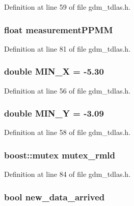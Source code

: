Definition at line 59 of file gdm\_\-tdlas.h.

\subsubsection[{measurementPPMM}]{\setlength{\rightskip}{0pt plus 5cm}float {\bf measurementPPMM}}\label{gdm__tdlas_8h_a3e354c17f76d0f236627d5285272e653}


Definition at line 81 of file gdm\_\-tdlas.h.

\subsubsection[{MIN\_\-X}]{\setlength{\rightskip}{0pt plus 5cm}double {\bf MIN\_\-X} = -\/5.30}\label{gdm__tdlas_8h_a3e390754b32f87824ad96ec0888958d3}


Definition at line 56 of file gdm\_\-tdlas.h.

\subsubsection[{MIN\_\-Y}]{\setlength{\rightskip}{0pt plus 5cm}double {\bf MIN\_\-Y} = -\/3.09}\label{gdm__tdlas_8h_a188814c015e92c2bd4daa2f823f07b75}


Definition at line 58 of file gdm\_\-tdlas.h.

\subsubsection[{mutex\_\-rmld}]{\setlength{\rightskip}{0pt plus 5cm}boost::mutex {\bf mutex\_\-rmld}}\label{gdm__tdlas_8h_ae711d53dd6a1e1c200e3b57589cbad0a}


Definition at line 84 of file gdm\_\-tdlas.h.

\subsubsection[{new\_\-data\_\-arrived}]{\setlength{\rightskip}{0pt plus 5cm}bool {\bf new\_\-data\_\-arrived}}\label{gdm__tdlas_8h_aa2d37e3128a894269a8f288fe34f9002}


